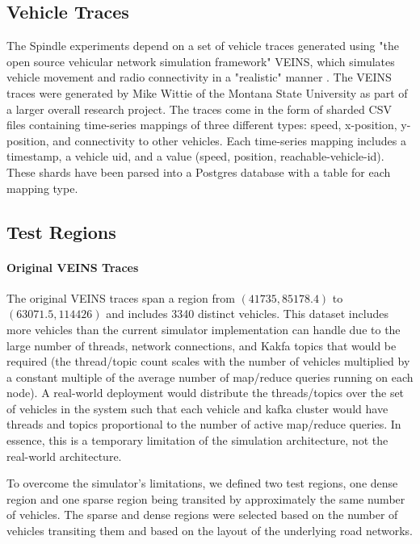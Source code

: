 \documentclass{thesis}
\begin{document}
\subsection{Vehicle Traces}
   The Spindle experiments depend on a set of vehicle traces 
   generated using "the open source vehicular network simulation framework" VEINS, which simulates
   vehicle movement and radio connectivity in a "realistic" manner \cite{veins}. The VEINS traces
   were generated by Mike Wittie of the Montana State University as part of a larger overall research
   project. 
   The traces come in the form of sharded CSV files containing time-series mappings of three different types:
   speed, x-position, y-position, and connectivity to other vehicles. Each time-series mapping includes
   a timestamp, a vehicle uid, and a value (speed, position, reachable-vehicle-id). 
   These shards have been parsed into a Postgres database with a table for each mapping type.
\subsection{Test Regions} %
    \paragraph{Original VEINS Traces}
        The original VEINS traces span a region from $(41735, 85178.4)$ to $(63071.5, 114426)$ and includes 3340 distinct
        vehicles. This dataset includes more vehicles than the current simulator implementation can handle due to the large
        number of threads, network connections, and Kakfa topics that would be required (the thread/topic count scales with the
        number of vehicles multiplied by a constant multiple of the average number of map/reduce queries running on each node).
        A real-world deployment would distribute the threads/topics over the set of vehicles in the system such that each
        vehicle and kafka cluster would have threads and topics proportional to the number of active map/reduce queries.
        In essence, this is a temporary limitation of the simulation architecture, not the real-world architecture.

        To overcome the simulator's limitations, we defined two test regions, one dense region and one sparse region
        being transited by approximately the same number of vehicles. The sparse and dense regions were selected based
        on the number of vehicles transiting them and based on the layout of the underlying road networks.
\end{document}
